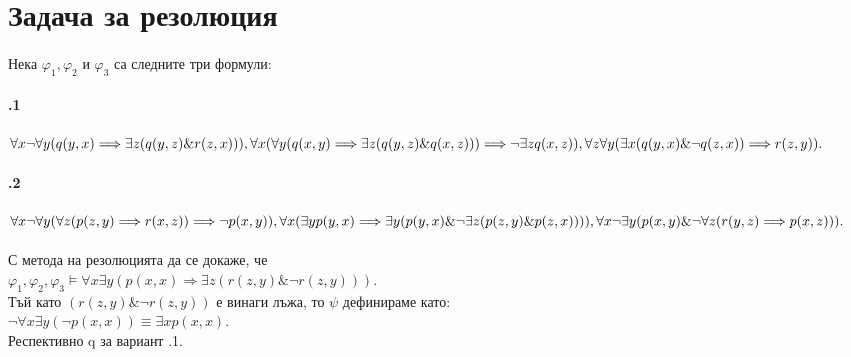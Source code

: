 \documentclass{article}
\begin{document}
\newpage
\section{Задача за резолюция}
\paragraph{}
Нека $\varphi_1, \varphi_2$ и $\varphi_3$ са следните три формули: 
\paragraph{\hspace{0.5em} .1} 
\begin{addmargin}[1em]{2em}
$\forall x\neg \forall y (q(y, x) \Longrightarrow \exists z (q(y, z)\&r(z, x))),\\
\forall x( \forall y ( q(x, y)\Longrightarrow \exists z(q(y,z)\&q(x, z))) \Longrightarrow \neg\exists z q(x,z)), \\
\forall z\forall y (\exists x(q(y,x)\&\neg q(z,x)) \Longrightarrow  r(z, y)).$
\end{addmargin}
\vskip 0.2in
\paragraph{\hspace{0.5em} .2} 
\begin{addmargin}[1em]{2em}
$\forall x\neg \forall y (\forall z(p(z, y) \Longrightarrow r(x, z))\Longrightarrow \neg p(x, y)),\\
\forall x( \exists y p(y,x) \Longrightarrow \exists y(p(y,x)\&\neg\exists z(p(z,y)\&p(z,x)))), \\
\forall x\neg\exists y (p(x,y)\&\neg\forall z(r(y,z) \Longrightarrow p(x, z))).$
\end{addmargin}
\paragraph{}
С метода на резолюцията да се докаже, че \\
\indent $\varphi_1, \varphi_2, \varphi_3 \models \forall x \exists y ( p(x,x) \Longrightarrow \exists z (r(z, y)\&\neg r(z, y))).$ \\
\indent * Тъй като $(r(z, y)\&\neg r(z, y))$ е винаги лъжа, то $\psi$ дефинираме като: \\ \indent $ \neg \forall x \exists y (\neg p(x,x))  \equiv \exists x p(x,x).$ \\
\indent Респективно q за вариант .1.
\end{document}

